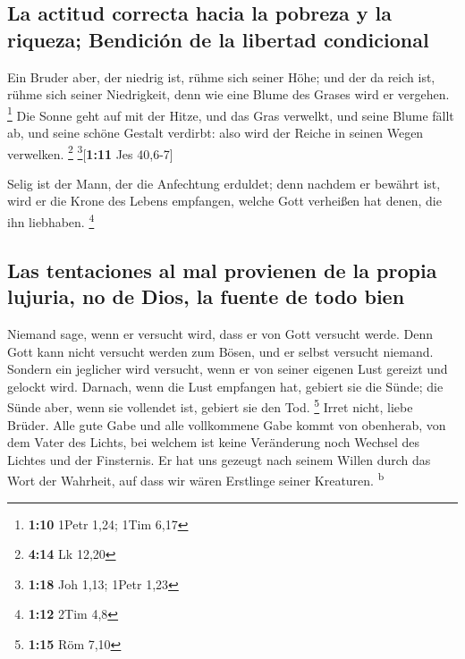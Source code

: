 \hypertarget{la-actitud-correcta-hacia-la-pobreza-y-la-riqueza-bendiciuxf3n-de-la-libertad-condicional}{%
\subsection{La actitud correcta hacia la pobreza y la riqueza; Bendición
de la libertad
condicional}\label{la-actitud-correcta-hacia-la-pobreza-y-la-riqueza-bendiciuxf3n-de-la-libertad-condicional}}

 Ein Bruder aber, der niedrig ist, rühme sich seiner Höhe;
 und der da reich ist, rühme sich seiner Niedrigkeit,
denn wie eine Blume des Grases wird er vergehen. \footnote{\textbf{1:10}
  1Petr 1,24; 1Tim 6,17}  Die Sonne geht auf mit der
Hitze, und das Gras verwelkt, und seine Blume fällt ab, und seine schöne
Gestalt verdirbt: also wird der Reiche in seinen Wegen verwelken.
\footnote{\textbf{4:14} Lk 12,20} \footnote{\textbf{1:18} Joh 1,13;
  1Petr 1,23}{[}\textbf{1:11} Jes 40,6-7{]}

 Selig ist der Mann, der die Anfechtung erduldet; denn
nachdem er bewährt ist, wird er die Krone des Lebens empfangen, welche
Gott verheißen hat denen, die ihn liebhaben. \footnote{\textbf{1:12}
  2Tim 4,8}

\hypertarget{las-tentaciones-al-mal-provienen-de-la-propia-lujuria-no-de-dios-la-fuente-de-todo-bien}{%
\subsection{Las tentaciones al mal provienen de la propia lujuria, no de
Dios, la fuente de todo
bien}\label{las-tentaciones-al-mal-provienen-de-la-propia-lujuria-no-de-dios-la-fuente-de-todo-bien}}

 Niemand sage, wenn er versucht wird, dass er von Gott
versucht werde. Denn Gott kann nicht versucht werden zum Bösen, und er
selbst versucht niemand.  Sondern ein jeglicher wird
versucht, wenn er von seiner eigenen Lust gereizt und gelockt wird.
 Darnach, wenn die Lust empfangen hat, gebiert sie die
Sünde; die Sünde aber, wenn sie vollendet ist, gebiert sie den Tod.
\footnote{\textbf{1:15} Röm 7,10}  Irret nicht, liebe
Brüder.  Alle gute Gabe und alle vollkommene Gabe kommt
von obenherab, von dem Vater des Lichts, bei welchem ist keine
Veränderung noch Wechsel des Lichtes und der Finsternis. 
Er hat uns gezeugt nach seinem Willen durch das Wort der Wahrheit, auf
dass wir wären Erstlinge seiner Kreaturen. \textsuperscript{b}

